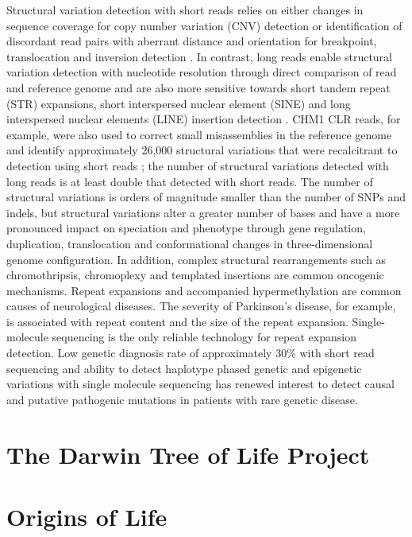 Structural variation detection with short reads relies on either changes in sequence coverage for copy number variation (CNV) detection or identification of discordant read pairs with aberrant distance and orientation for breakpoint, translocation and inversion detection \cite{Alkan2011-dv}. In contrast, long reads enable structural variation detection with nucleotide resolution through direct comparison of read and reference genome and are also more sensitive towards short tandem repeat (STR) expansions, short interspersed nuclear element (SINE) and long interspersed nuclear elements (LINE) insertion detection \cite{Chaisson2015-zz, Sedlazeck2018-oh, Denti2022-ux}. CHM1 CLR reads, for example, were also used to correct small misassemblies in the reference genome and identify approximately 26,000 structural variations that were recalcitrant to detection using short reads \cite{Chaisson2015-zz}; the number of structural variations detected with long reads is at least double that detected with short reads. The number of structural variations is orders of magnitude smaller than the number of SNPs and indels, but structural variations alter a greater number of bases and have a more pronounced impact on speciation and phenotype through gene regulation, duplication, translocation\cite{Weischenfeldt2013-tl} and conformational changes in three-dimensional genome configuration\cite{Spielmann2018-fm,}. In addition, complex structural rearrangements such as chromothripsis\cite{Stephens2011-gj, Korbel2013-to}, chromoplexy\cite{Baca2013-po} and templated insertions\cite{Yu2010-jr} are common oncogenic mechanisms. Repeat expansions and accompanied hypermethylation are common causes of neurological diseases\cite{Zhou2022-ci}. The severity of Parkinson’s disease, for example, is associated with repeat content and the size of the repeat expansion\cite{}. Single-molecule sequencing is the only reliable technology for repeat expansion detection. Low genetic diagnosis rate of approximately 30\% with short read sequencing and ability to detect haplotype phased genetic and epigenetic variations with single molecule sequencing has renewed interest to detect causal and putative pathogenic mutations in patients with rare genetic disease\cite{}. 

\section{The Darwin Tree of Life Project}

\section{Origins of Life}


